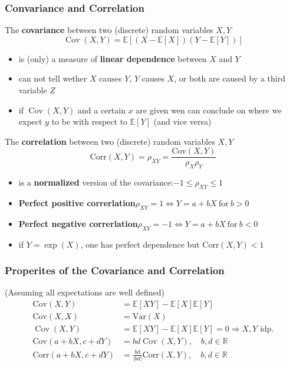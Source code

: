 \subsubsection{Convariance and Correlation}
The \textbf{covariance} between two (discrete) random variables $X,Y$
\noindent\begin{equation*}
    \operatorname{Cov}(X,Y)=\mathbb{E}[(X-\mathbb{E}[X])(Y-\mathbb{E}[Y])]
\end{equation*}
\begin{itemize}
    \item is (only) a measure of \textbf{linear dependence} between $X$ and $Y$
    \item can not tell wether $X$ causes $Y$, $Y$ causes $X$, or both are caused by a third variable $Z$
    \item if $\operatorname{Cov}(X,Y)$ and a certain $x$ are given wen can conclude on where we expect $y$ to be with respect to $\mathbb{E}[Y]$ (and vice versa)
\end{itemize}

\newpar{}
The \textbf{correlation} between two (discrete) random variables $X,Y$
\noindent\begin{equation*}
    \mathrm{Corr}(X,Y)=\rho_{XY}=\frac{\mathrm{Cov}(X,Y)}{\rho_{X}\rho_{Y}}
\end{equation*}
\begin{itemize}
    \item is a \textbf{normalized} version of the covariance:\newline$-1 \leq \rho_{XY} \leq 1$
    \item \textbf{Perfect positive correrlation}\newline $\rho_{XY}=1\Leftrightarrow Y=a+bX\mathrm{~for~}b>0$
    \item \textbf{Perfect negative correrlation}\newline $\rho_{XY}=-1\Leftrightarrow Y=a+bX\mathrm{~for~}b<0$
    \item if $Y=\exp(X)$, one has perfect dependence but $\mathrm{Corr}(X,Y)<1$
\end{itemize}

\subsubsection{Properites of the Covariance and Correlation}
(Assuming all expectations are well defined)
\noindent\begin{align*}
    \mathrm{Cov}(X,Y)        & = \mathbb{E}[XY]-\mathbb{E}[X]\mathbb{E}[Y]                              \\
    \mathrm{Cov}(X,X)        & = \mathrm{Var}(X)                                                        \\
    \operatorname{Cov}(X,Y)  & =\mathbb{E}[XY]-\mathbb{E}[X]\mathbb{E}[Y]=0 \Rightarrow X,Y\text{ idp.} \\
    \mathrm{Cov}(a+bX,c+dY)  & =bd\operatorname{Cov}(X,Y),\quad b,d\in\mathbb{R}                        \\
    \mathrm{Corr}(a+bX,c+dY) & ={\frac{bd}{|bd|}}\mathrm{Corr}(X,Y),\quad b,d\in\mathbb{R}
\end{align*}

